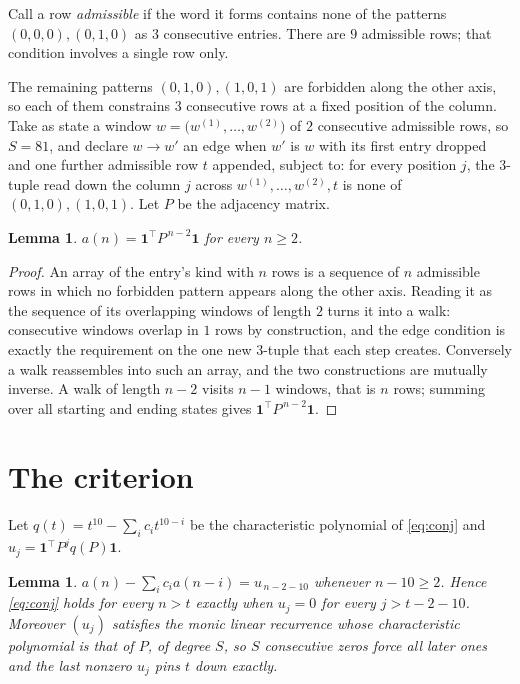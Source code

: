 \documentclass[11pt,a4paper]{article}
\theoremstyle{plain}
\newtheorem{lemma}[theorem]{Lemma}
\theoremstyle{definition}
\begin{document}
Call a row \emph{admissible} if the word it forms contains none of the patterns
$(0,0,0), (0,1,0)$ as $3$ consecutive entries. There are $9$ admissible rows; that condition
involves a single row only.

The remaining patterns $(0,1,0), (1,0,1)$ are forbidden along the other axis, so each of them
constrains $3$ consecutive rows at a fixed position of the column. Take as state a
window $w=\bigl(w^{(1)},\dots,w^{(2)}\bigr)$ of $2$ consecutive admissible
rows, so $S=81$, and declare $w\to w'$ an edge when $w'$ is $w$ with its first entry
dropped and one further admissible row $t$ appended, subject to: for every position
$j$, the $3$-tuple read down the column $j$ across $w^{(1)},\dots,w^{(2)},t$
is none of $(0,1,0), (1,0,1)$. Let $P$ be the adjacency matrix.

\begin{lemma}\label{lem:walk}
$a(n)=\mathbf{1}^{\!\top}P^{\,n-2}\mathbf{1}$ for every $n\ge2$.
\end{lemma}

\begin{proof}
An array of the entry's kind with $n$ rows is a sequence of $n$ admissible rows in
which no forbidden pattern appears along the other axis. Reading it as the sequence of its
overlapping windows of length $2$ turns it into a walk: consecutive windows overlap in
$1$ rows by construction, and the edge condition is exactly the requirement on the one
new $3$-tuple that each step creates. Conversely a walk reassembles into such an array,
and the two constructions are mutually inverse. A walk of length $n-2$ visits $n-1$
windows, that is $n$ rows; summing over all starting and ending states gives
$\mathbf{1}^{\!\top}P^{\,n-2}\mathbf{1}$.
\end{proof}

\section{The criterion}

Let $q(t)=t^{10}-\sum_i c_i t^{10-i}$ be the characteristic polynomial of
\eqref{eq:conj} and $u_j=\mathbf{1}^{\!\top}P^{j}q(P)\mathbf{1}$.

\begin{lemma}\label{lem:crit}
$a(n)-\sum_i c_i a(n-i)=u_{\,n-2-10}$ whenever $n-10\ge2$. Hence
\eqref{eq:conj} holds for every $n>t$ exactly when $u_j=0$ for every
$j>t-2-10$. Moreover $(u_j)$ satisfies the monic linear recurrence whose
characteristic polynomial is that of $P$, of degree $S$, so $S$ consecutive zeros force all
later ones and the last nonzero $u_j$ pins $t$ down exactly.
\end{lemma}
\end{document}
